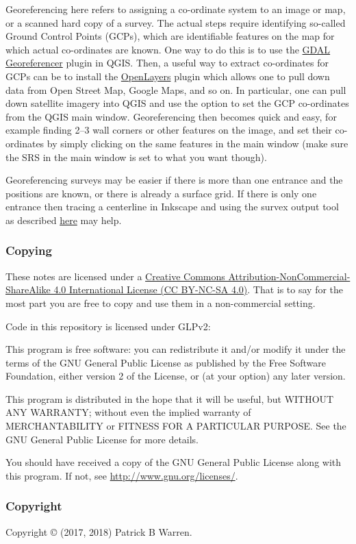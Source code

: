 \documentclass[]{article}
\begin{document}
Georeferencing here refers to assigning a co-ordinate system to an image
or map, or a scanned hard copy of a survey. The actual steps require
identifying so-called Ground Control Points (GCPs), which are
identifiable features on the map for which actual co-ordinates are
known. One way to do this is to use the
\href{https://docs.qgis.org/2.8/en/docs/user_manual/plugins/plugins_georeferencer.html}{GDAL
Georeferencer} plugin in QGIS. Then, a useful way to extract
co-ordinates for GCPs can be to install the
\href{https://plugins.qgis.org/plugins/openlayers_plugin/}{OpenLayers}
plugin which allows one to pull down data from Open Street Map, Google
Maps, and so on. In particular, one can pull down satellite imagery into
QGIS and use the option to set the GCP co-ordinates from the QGIS main
window. Georeferencing then becomes quick and easy, for example finding
2--3 wall corners or other features on the image, and set their
co-ordinates by simply clicking on the same features in the main window
(make sure the SRS in the main window is set to what you want though).

Georeferencing surveys may be easier if there is more than one entrance
and the positions are known, or there is already a surface grid. If
there is only one entrance then tracing a centerline in Inkscape and
using the survex output tool as described
\href{https://github.com/patrickbwarren/inkscape-survex-export}{here}
may help.

\subsubsection{Copying}\label{copying}

These notes are licensed under a
\href{https://creativecommons.org/licenses/by-nc-sa/4.0/}{Creative
Commons Attribution-NonCommercial-ShareAlike 4.0 International License
(CC BY-NC-SA 4.0)}. That is to say for the most part you are free to
copy and use them in a non-commercial setting.

Code in this repository is licensed under GLPv2:

This program is free software: you can redistribute it and/or modify it
under the terms of the GNU General Public License as published by the
Free Software Foundation, either version 2 of the License, or (at your
option) any later version.

This program is distributed in the hope that it will be useful, but
WITHOUT ANY WARRANTY; without even the implied warranty of
MERCHANTABILITY or FITNESS FOR A PARTICULAR PURPOSE. See the GNU General
Public License for more details.

You should have received a copy of the GNU General Public License along
with this program. If not, see \url{http://www.gnu.org/licenses/}.

\subsubsection{Copyright}\label{copyright}

Copyright © (2017, 2018) Patrick B Warren.
\end{document}
